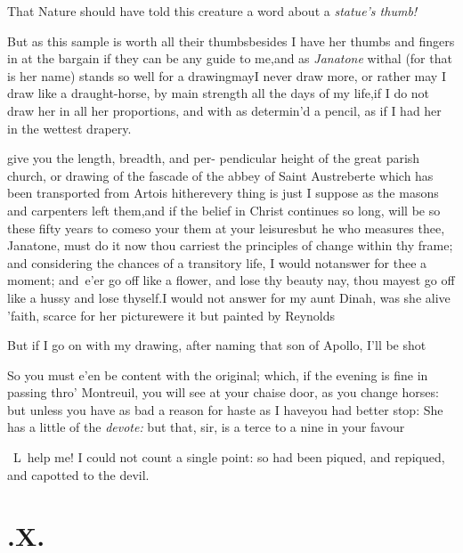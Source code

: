 \documentclass{article}
\begin{document}
\tsk That Nature should have told this creature a word
about a \textit{statue’s thumb!}\tsh

\tsk But as this sample is worth all their thumbs\tsh besides I
have her thumbs and fingers in at the bargain if they can be
any guide to me,\tsk and as \textit{Janatone} withal (for that
is her name) stands so well for a drawing\tsh may\break I never draw
more, or rather may I draw like a draught-horse, by main
strength all the days of my life,\tsk if I do not draw her in
all her proportions, and with as determin’d a
pencil, as if I had her in the wettest drapery.\tsh

\noindent
{}\break give you the length, breadth, and
per-\break
pendicular height of the great parish church, or drawing of the fascade of the
abbey of Saint Austreberte which has been transported from Artois
hither\tsk every thing is just I suppose as the masons and carpenters left them,\tsk and
if the\break
belief in Christ continues so long, will be\break
so these fifty years to come\tsk so your\break
{}\break
them at your leisures\tsk but he who\break
measures thee, Janatone, must do it now\break
\tsk thou carriest the
principles of change within thy frame; and considering the chances of a transitory
life, I would not\break answer for thee a moment; and\sic\ e’er
go off like a flower, and lose thy beauty\break
\tsk nay, thou mayest go off like a hussy\break
\tsk and lose thyself.\tsk I would not answer for my aunt Dinah, was she alive\tsh
’faith, scarce for her picture\tsh were it but painted by Reynolds\tsk

\tsk But if I go on with my drawing, after naming that son of
Apollo, I’ll be shot\tsh

So you must e’en be content with the original; which, if the evening is fine in
passing thro’ Montreuil, you will see at your chaise door, as you change horses: but
unless you have as bad a reason for haste as I have\tsk you had better stop:\tsk{}
\tsk She has a little of the \textit{devote:} but\break
that, sir, is a terce to a nine in your\break
favour\tsh

\tsk\ L\tsk\ help me! I could not count a single point: so
had been piqued, and repiqued, and capotted to the devil.

\section{.\enspace X.}
\end{document}
